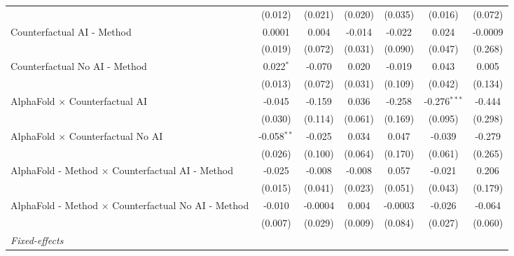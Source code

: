 \begin{tabular}{lcccccc}
                                                              & (0.012)       & (0.021)       & (0.020)       & (0.035)       & (0.016)        & (0.072)\\   
   Counterfactual AI - Method                                 & 0.0001        & 0.004         & -0.014        & -0.022        & 0.024          & -0.0009\\   
                                                              & (0.019)       & (0.072)       & (0.031)       & (0.090)       & (0.047)        & (0.268)\\   
   Counterfactual No AI - Method                              & 0.022$^{*}$   & -0.070        & 0.020         & -0.019        & 0.043          & 0.005\\   
                                                              & (0.013)       & (0.072)       & (0.031)       & (0.109)       & (0.042)        & (0.134)\\   
   AlphaFold $\times$ Counterfactual AI                       & -0.045        & -0.159        & 0.036         & -0.258        & -0.276$^{***}$ & -0.444\\   
                                                              & (0.030)       & (0.114)       & (0.061)       & (0.169)       & (0.095)        & (0.298)\\   
   AlphaFold $\times$ Counterfactual No AI                    & -0.058$^{**}$ & -0.025        & 0.034         & 0.047         & -0.039         & -0.279\\   
                                                              & (0.026)       & (0.100)       & (0.064)       & (0.170)       & (0.061)        & (0.265)\\   
   AlphaFold - Method $\times$ Counterfactual AI - Method     & -0.025        & -0.008        & -0.008        & 0.057         & -0.021         & 0.206\\   
                                                              & (0.015)       & (0.041)       & (0.023)       & (0.051)       & (0.043)        & (0.179)\\   
   AlphaFold - Method $\times$ Counterfactual No AI - Method  & -0.010        & -0.0004       & 0.004         & -0.0003       & -0.026         & -0.064\\   
                                                              & (0.007)       & (0.029)       & (0.009)       & (0.084)       & (0.027)        & (0.060)\\   
   \midrule
   \emph{Fixed-effects}\\

\end{tabular}
